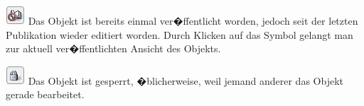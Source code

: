 \includegraphics[scale=0.7]{./images/icons_status_modified.jpg} 
  Das Objekt ist bereits einmal ver�ffentlicht worden, jedoch seit der letzten
  Publikation wieder editiert worden. Durch Klicken auf das Symbol gelangt
  man zur aktuell ver�ffentlichten Ansicht des Objekts.

\includegraphics[scale=0.7]{./images/icons_status_locked.jpg} 
  Das Objekt ist gesperrt, �blicherweise, weil jemand anderer das Objekt gerade
  bearbeitet.\footnotemark
  
%

